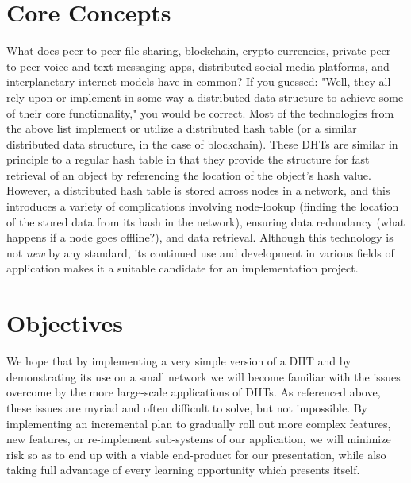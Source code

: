 \documentclass[12pt]{report}
\begin{document}
    \section{Core Concepts}
    What does peer-to-peer file sharing\cite{bittorrent-wiki}, blockchain,
    crypto-currencies\cite{ethereum-rlp}, private peer-to-peer voice and text
    messaging apps\cite{tox-site}, distributed social-media
    platforms\cite{distributed-social-networks}, and interplanetary internet
    models\cite{ipfs-site} have in common?  If you guessed: "Well, they all rely
    upon or implement in some way a distributed data structure to achieve some
    of their core functionality," you would be correct.  Most of the
    technologies from the above list implement or utilize a distributed hash
    table (or a similar distributed data structure, in the case of blockchain).
    These DHTs are similar in principle to a regular hash table in that they
    provide the structure for fast retrieval of an object by referencing the
    location of the object's hash value.  However, a distributed hash table is
    stored across nodes in a network, and this introduces a variety of
    complications involving node-lookup (finding the location of the stored data
    from its hash in the network), ensuring data redundancy (what happens if a
    node goes offline?), and data retrieval.  Although this technology is not
    \textit{new} by any standard, its continued use and development in various
    fields of application makes it a suitable candidate for an implementation
    project.
    
    \section{Objectives}
    We hope that by implementing a very simple version of a DHT and by demonstrating
    its use on a small network we will become familiar with the issues
    overcome by the more large-scale applications of DHTs.  As referenced above,
    these issues are myriad and often difficult to solve, but not impossible.
    By implementing an incremental plan to gradually roll out more complex features, new
    features, or re-implement sub-systems of our application, we will minimize
    risk so as to end up with a viable end-product for our presentation, while
    also taking full advantage of every learning opportunity which presents
    itself.
\end{document}
